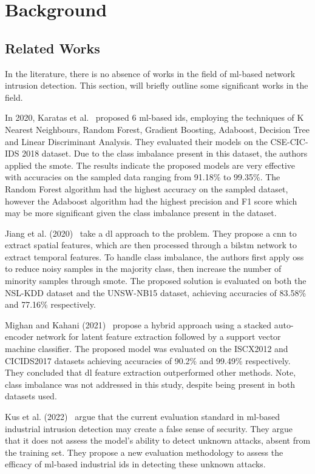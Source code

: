 \chapter{Background}%
\label{chp:background}

\section{Related Works}%
\label{sec:related}

In the literature, there is no absence of works in the field of \gls{ml}-based
network intrusion detection. This section, will briefly outline some
significant works in the field.

In 2020, Karatas et al.~\cite{Karatas} proposed 6 \gls{ml}-based \gls{ids},
employing the techniques of K Nearest Neighbours, Random Forest, Gradient
Boosting, Adaboost, Decision Tree and Linear Discriminant Analysis. They
evaluated their models on the CSE-CIC-IDS 2018 dataset. Due to the class
imbalance present in this dataset, the authors applied the \gls{smote}. The
results indicate the proposed models are very effective with accuracies on the
sampled data ranging from 91.18\% to 99.35\%. The Random Forest algorithm had
the highest accuracy on the sampled dataset, however the Adaboost algorithm had
the highest precision and F1 score which may be more significant given the
class imbalance present in the dataset.

Jiang et al. (2020)~\cite{Jiang} take a \gls{dl} approach to the problem. They
propose a \gls{cnn} to extract spatial features, which are then processed
through a \gls{bilstm} network to extract temporal features. To handle class
imbalance, the authors first apply \gls{oss} to reduce noisy samples in the
majority class, then increase the number of minority samples through
\gls{smote}. The proposed solution is evaluated on both the NSL-KDD dataset and
the UNSW-NB15 dataset, achieving accuracies of 83.58\% and 77.16\%
respectively.

Mighan and Kahani (2021)~\cite{Mighan} propose a hybrid approach using a
stacked auto-encoder network for latent feature extraction followed by a
support vector machine classifier. The proposed model was evaluated on the
ISCX2012 and CICIDS2017 datasets achieving accuracies of 90.2\% and 99.49\%
respectively. They concluded that \gls{dl} feature extraction outperformed
other methods. Note, class imbalance was not addressed in this study, despite
being present in both datasets used.

Kus et al. (2022)~\cite{Kus} argue that the current evaluation standard in
\gls{ml}-based industrial intrusion detection may create a false sense of
security. They argue that it does not assess the model's ability to detect
unknown attacks, absent from the training set. They propose a new evaluation
methodology to assess the efficacy of \gls{ml}-based industrial \gls{ids} in
detecting these unknown attacks.

